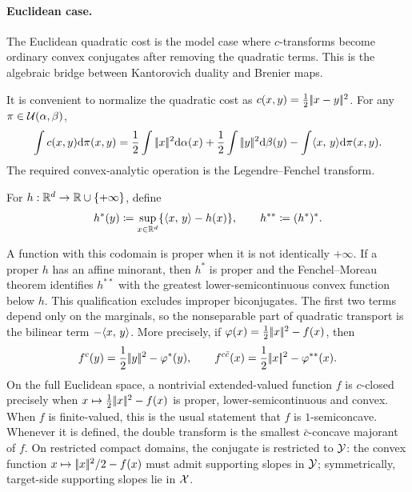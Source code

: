 \paragraph{Euclidean case.}

The Euclidean quadratic cost is the model case where $c$-transforms become ordinary convex conjugates after removing the quadratic terms. This is the algebraic bridge between Kantorovich duality and Brenier maps.

It is convenient to normalize the quadratic cost as
$c(x,y)=\frac12|\!| x-y |\!|^2$. For any $\pi\in\mathcal{U}(\alpha,\beta)$,
\[
	\int c(x,y)\mathrm{d}\pi(x,y)
	=
	\frac12\int|\!| x |\!|^2\mathrm{d}\alpha(x)
	+\frac12\int|\!| y |\!|^2\mathrm{d}\beta(y)
	-\int \langle x,\,y\rangle\mathrm{d}\pi(x,y).
\]
The required convex-analytic operation is the Legendre--Fenchel transform.
\begin{defn}\label{def-legendre-fenchel-transform}
	For $h:\mathbb{R}^d\to\mathbb{R}\cup\{+\infty\}$, define
	\[
		h^*(y)\coloneqq\sup_{x\in\mathbb{R}^d}\{\langle x,\,y\rangle-h(x)\},
		\qquad
		h^{**}\coloneqq(h^*)^*.
	\]
\end{defn}
A function with this codomain is proper when it is not identically $+\infty$. If a proper $h$ has an affine minorant, then $h^*$ is proper and the Fenchel--Moreau theorem identifies $h^{**}$ with the greatest lower-semicontinuous convex function below $h$. This qualification excludes improper biconjugates.
The first two terms depend only on the marginals, so the nonseparable part of quadratic transport is the bilinear term $-\langle x,\,y\rangle$. More precisely, if
$\varphi(x)=\frac12|\!| x |\!|^2-f(x)$, then
\[
	f^c(y)
	=
	\frac12|\!| y |\!|^2-\varphi^*(y),
	\qquad
	f^{c\bar c}(x)
	=
	\frac12|\!| x |\!|^2-\varphi^{**}(x).
\]
On the full Euclidean space, a nontrivial extended-valued function $f$ is $c$-closed precisely when
$x\mapsto\frac12|\!| x |\!|^2-f(x)$ is proper, lower-semicontinuous and convex. When $f$ is finite-valued, this is the usual statement that $f$ is $1$-semiconcave. Whenever it is defined, the double transform is the smallest $\bar c$-concave majorant of $f$. On restricted compact domains, the conjugate is restricted to $\mathcal{Y}$: the convex function $x\mapsto|\!| x |\!|^2/2-f(x)$ must admit supporting slopes in $\mathcal{Y}$; symmetrically, target-side supporting slopes lie in $\mathcal{X}$.

